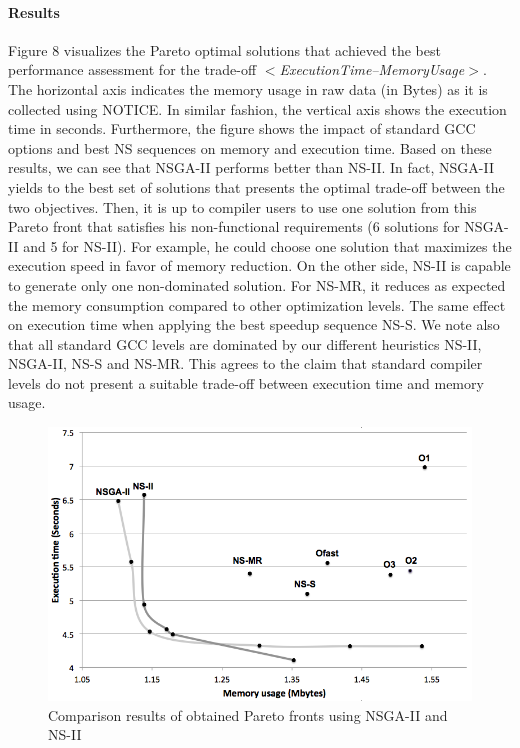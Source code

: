 \paragraph{Results}
Figure 8 visualizes the Pareto optimal solutions that achieved the best performance assessment for the trade-off \textit{$<$ExecutionTime--MemoryUsage$>$}. The horizontal axis indicates the memory usage in raw data (in Bytes) as it is collected using NOTICE. In similar fashion, the vertical axis shows the execution time in seconds. Furthermore, the figure shows the impact of standard GCC options and best NS sequences on memory and execution time. Based on these results, we can see that NSGA-II performs better than NS-II. In fact, NSGA-II yields to the best set of solutions that presents the optimal trade-off between the two objectives. Then, it is up to compiler users to use one solution from this Pareto front that satisfies his non-functional requirements (6 solutions for NSGA-II and 5 for NS-II). For example, he could choose one solution that maximizes the execution speed in favor of memory reduction. On the other side, NS-II is capable to generate only one non-dominated solution. For NS-MR, it reduces as expected the memory consumption compared to other optimization levels. The same effect on execution time when applying the best speedup sequence NS-S. We note also that all standard GCC levels are dominated by our different heuristics NS-II, NSGA-II, NS-S and NS-MR.
This agrees to the claim that standard compiler levels do not present a suitable trade-off between execution time and memory usage.


 


\begin{figure}[h]
	\centering
	\includegraphics[width=1.\linewidth]{Ressources/pareto.png}
	\caption{Comparison results of obtained Pareto fronts using NSGA-II and NS-II}
\end{figure}


